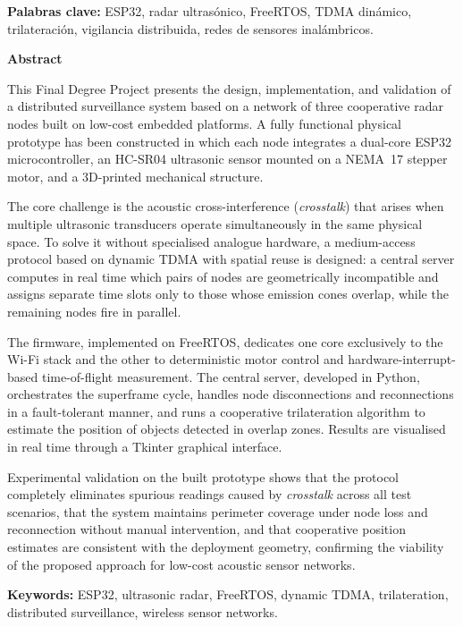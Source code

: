 \textbf{Palabras clave:} ESP32, radar ultrasónico, FreeRTOS, TDMA dinámico, trilateración,
vigilancia distribuida, redes de sensores inalámbricos.

\clearpage


{}

\begin{flushleft}
{\Huge \textbf{\sffamily Abstract}}
\end{flushleft}
\vspace{0.5cm}

This Final Degree Project presents the design, implementation, and validation of a distributed surveillance system based on a network of three cooperative radar nodes built on low-cost embedded platforms. A fully functional physical prototype has been constructed in which each node integrates a dual-core ESP32 microcontroller, an HC-SR04 ultrasonic sensor mounted on a NEMA~17 stepper motor, and a 3D-printed mechanical structure.

The core challenge is the acoustic cross-interference (\textit{crosstalk}) that arises when multiple ultrasonic transducers operate simultaneously in the same physical space. To solve it without specialised analogue hardware, a medium-access protocol based on dynamic TDMA with spatial reuse is designed: a central server computes in real time which pairs of nodes are geometrically incompatible and assigns separate time slots only to those whose emission cones overlap, while the remaining nodes fire in parallel.

The firmware, implemented on FreeRTOS, dedicates one core exclusively to the Wi-Fi stack and the other to deterministic motor control and hardware-interrupt-based time-of-flight measurement. The central server, developed in Python, orchestrates the superframe cycle, handles node disconnections and reconnections in a fault-tolerant manner, and runs a cooperative trilateration algorithm to estimate the position of objects detected in overlap zones. Results are visualised in real time through a Tkinter graphical interface.

Experimental validation on the built prototype shows that the protocol completely eliminates spurious readings caused by \textit{crosstalk} across all test scenarios, that the system maintains perimeter coverage under node loss and reconnection without manual intervention, and that cooperative position estimates are consistent with the deployment geometry, confirming the viability of the proposed approach for low-cost acoustic sensor networks.

\textbf{Keywords:} ESP32, ultrasonic radar, FreeRTOS, dynamic TDMA, trilateration,
distributed surveillance, wireless sensor networks.

\clearpage

